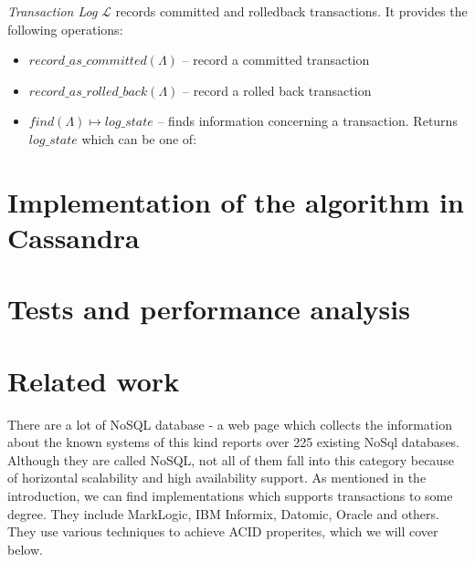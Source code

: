 \documentclass[runningheads,a4paper]{llncs}
\newcommand{\txLog}{$\mathcal{L}$\xspace}
\newcommand{\txState}{$\Lambda$\xspace}
\begin{document}
\begin{definition}
  \label{def:transactionLog}
  \emph{Transaction Log} \txLog records committed and rolledback transactions. It provides the following operations:
  \begin{itemize}
    \item $\mathit{record\_as\_committed(\text{\txState})}$ -- record a committed transaction
    \item $\mathit{record\_as\_rolled\_back(\text{\txState})}$ -- record a rolled back transaction
    \item $\mathit{find(\text{\txState})} \mapsto \mathit{log\_state}$ -- finds information concerning a transaction. Returns $\mathit{log\_state}$ which can be one of:  
  \end{itemize}
\end{definition}

\section{Implementation of the algorithm in Cassandra}

\section{Tests and performance analysis}

\section{Related work}

There are a lot of NoSQL database - a web page which collects the information about the known systems of this kind \cite{NoSqlDatabasesOrg} reports over 225 existing NoSql databases. Although they are called NoSQL, not all of them fall into this category because of horizontal scalability and high availability support. As mentioned in the introduction, we can find implementations which supports  transactions to some degree. They include MarkLogic, IBM Informix, Datomic, Oracle and others. They use various techniques to achieve ACID properites, which we will cover below. 
\end{document}
